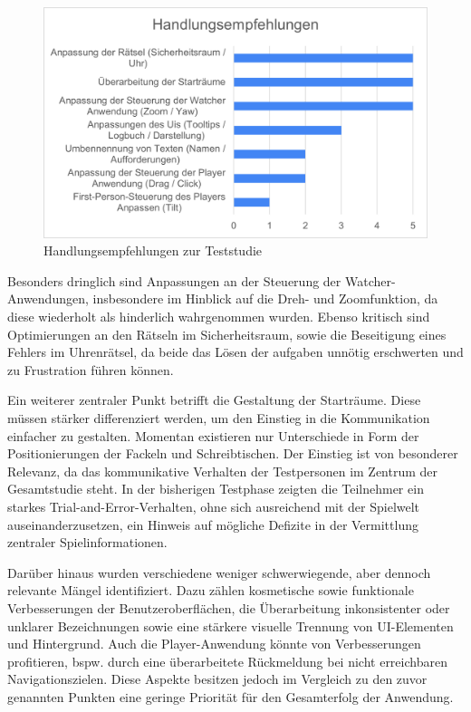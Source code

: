 \begin{figure}[ht]
\centering
\includegraphics[width=1\linewidth]{content/pictures/Handlungsempfehlung_Vorstudie.png}
\caption{Handlungsempfehlungen zur Teststudie}
\label{fig:handlungsempfehlungen-vorstudie}
\end{figure}

Besonders dringlich sind Anpassungen an der Steuerung der Watcher-Anwendungen, insbesondere im Hinblick auf die Dreh- und Zoomfunktion, da diese wiederholt als hinderlich wahrgenommen wurden. Ebenso kritisch sind Optimierungen an den Rätseln im Sicherheitsraum, sowie die Beseitigung eines Fehlers im Uhrenrätsel, da beide das Lösen der aufgaben unnötig erschwerten und zu Frustration führen können.

Ein weiterer zentraler Punkt betrifft die Gestaltung der Starträume. Diese müssen stärker differenziert werden, um den Einstieg in die Kommunikation einfacher zu gestalten. Momentan existieren nur Unterschiede in Form der Positionierungen der Fackeln und Schreibtischen. Der Einstieg ist von besonderer Relevanz, da das kommunikative Verhalten der Testpersonen im Zentrum der Gesamtstudie steht. In der bisherigen Testphase zeigten die Teilnehmer ein starkes Trial-and-Error-Verhalten, ohne sich ausreichend mit der Spielwelt auseinanderzusetzen, ein Hinweis auf mögliche Defizite in der Vermittlung zentraler Spielinformationen.

Darüber hinaus wurden verschiedene weniger schwerwiegende, aber dennoch relevante Mängel identifiziert. Dazu zählen kosmetische sowie funktionale Verbesserungen der Benutzeroberflächen, die Überarbeitung inkonsistenter oder unklarer Bezeichnungen sowie eine stärkere visuelle Trennung von \ac{UI}-Elementen und Hintergrund. Auch die Player-Anwendung könnte von Verbesserungen profitieren, bspw. durch eine überarbeitete Rückmeldung bei nicht erreichbaren Navigationszielen. Diese Aspekte besitzen jedoch im Vergleich zu den zuvor genannten Punkten eine geringe Priorität für den Gesamterfolg der Anwendung.

